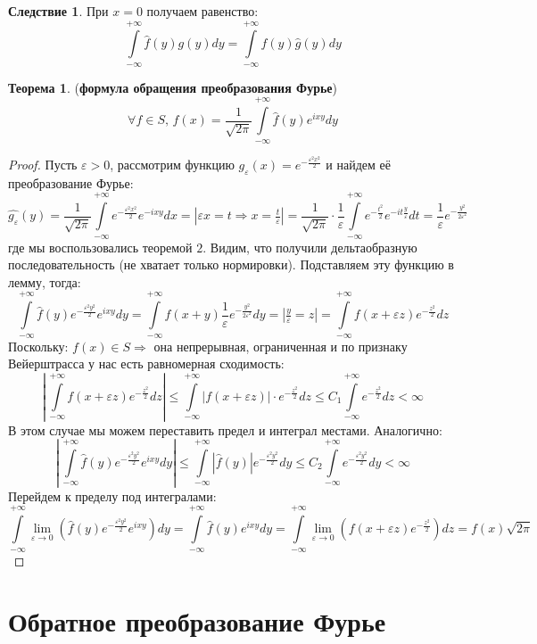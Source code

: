 \documentclass[12pt]{article}
\newcommand{\VE}{\varepsilon}
\theoremstyle{definition}
\newtheorem{theorem}{Теорема}
\newtheorem{corollary}{Следствие}
\newcommand{\ddint}[2]{\displaystyle\int\limits_{#1}^{#2}}
\newcommand{\wht}[1]{\widehat{#1}}
\begin{document}
\begin{corollary}
	При $x = 0$ получаем равенство: 
	$$
		\ddint{-\infty}{+\infty}\wht{f}(y)g(y)dy = \ddint{-\infty}{+\infty}f(y)\wht{g}(y)dy	
	$$
\end{corollary}

\begin{theorem}(\textbf{формула обращения преобразования Фурье})
	$$
		\forall f \in S, \, f(x) = \dfrac{1}{\sqrt{2\pi}}\ddint{-\infty}{+\infty}\wht{f}(y)e^{ixy}dy
	$$
\end{theorem}
\begin{proof}
	Пусть $\VE > 0$, рассмотрим функцию $g_\VE(x) = e^{-\tfrac{\VE^2 x^2}{2}}$ и найдем её преобразование Фурье:
	$$
		\wht{g_\VE}(y) = \dfrac{1}{\sqrt{2\pi}}\ddint{-\infty}{+\infty}e^{-\tfrac{\VE^2 x^2}{2}}e^{-ixy}dx = \left|\VE x = t \Rightarrow x =\tfrac{t}{\VE}\right| = \dfrac{1}{\sqrt{2\pi}}{\cdot}\dfrac{1}{\VE}\ddint{-\infty}{+\infty}e^{-\tfrac{t^2}{2}}e^{-it\tfrac{y}{\VE}}dt = \dfrac{1}{\VE}e^{-\tfrac{y^2}{2\VE^2}}
	$$
	где мы воспользовались теоремой $2$. Видим, что получили дельтаобразную последовательность (не хватает только нормировки). Подставляем эту функцию в лемму, тогда:
	$$
		\ddint{-\infty}{+\infty}\wht{f}(y)e^{-\tfrac{\VE^2 y^2}{2}}e^{ixy}dy = \ddint{-\infty}{+\infty}f(x + y)\dfrac{1}{\VE}e^{-\tfrac{y^2}{2\VE^2}}dy = \left|\tfrac{y}{\VE} = z\right| = \ddint{-\infty}{+\infty}f(x + \VE z)e^{-\tfrac{z^2}{2}}dz
	$$
	Поскольку: $f(x) \in S \Rightarrow$ она непрерывная, ограниченная и по признаку Вейерштрасса у нас есть равномерная сходимость:
	$$
		\left|\,\ddint{-\infty}{+\infty}f(x + \VE z)e^{-\tfrac{z^2}{2}}dz\right| \leq \ddint{-\infty}{+\infty}|f(x + \VE z)|{\cdot} e^{-\tfrac{z^2}{2}}dz \leq C_1\ddint{-\infty}{+\infty}e^{-\tfrac{z^2}{2}}dz < \infty
	$$
	В этом случае мы можем переставить предел и интеграл местами. Аналогично:
	$$
		\left|\,\ddint{-\infty}{+\infty}\wht{f}(y)e^{-\tfrac{\VE^2 y^2}{2}}e^{ixy}dy\right| \leq \ddint{-\infty}{+\infty}\left|\wht{f}(y)\right|e^{-\tfrac{\VE^2 y^2}{2}}dy \leq C_2 \ddint{-\infty}{+\infty}e^{-\tfrac{\VE^2 y^2}{2}}dy < \infty 
	$$
	Перейдем к пределу под интегралами:
	$$
		\ddint{-\infty}{+\infty}\lim\limits_{\VE \to 0}\left(\wht{f}(y)e^{-\tfrac{\VE^2 y^2}{2}}e^{ixy}\right)dy = \ddint{-\infty}{+\infty}\wht{f}(y)e^{ixy}dy = \ddint{-\infty}{+\infty}\lim\limits_{\VE \to 0}\left(f(x + \VE z)e^{-\tfrac{z^2}{2}}\right)dz = f(x)\sqrt{2\pi}
	$$
\end{proof}
\newpage
\section*{Обратное преобразование Фурье}
\end{document}
